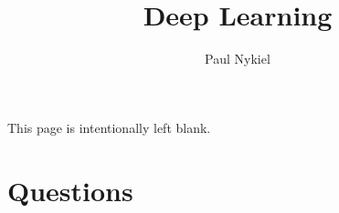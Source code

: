 \documentclass[10pt]{report}
\title{Deep Learning}
\author{Paul Nykiel}
\begin{document}
    \maketitle
    \pagebreak
    This page is intentionally left blank.
    \pagebreak
    \tableofcontents
    \pagebreak
    \chapter{Questions}
    
    
    
    
    
    
    
    
    
    
\end{document}
